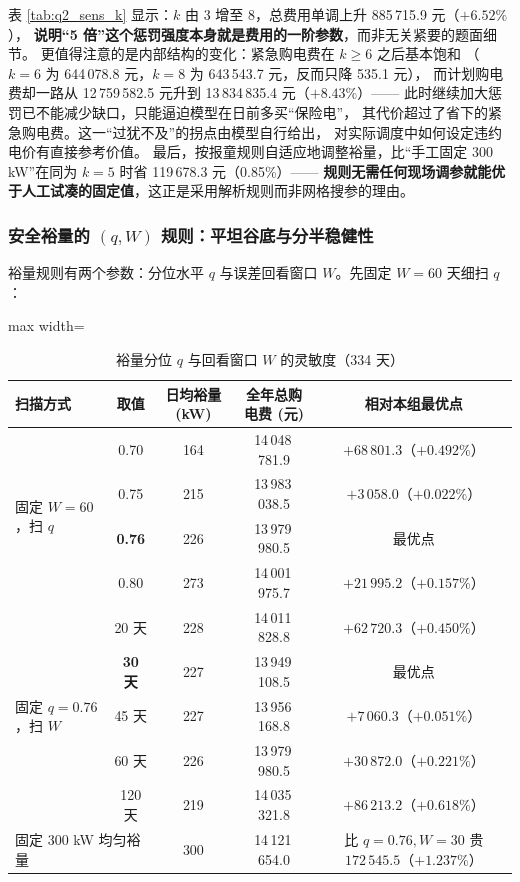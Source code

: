 \documentclass{cumcmthesis}
\begin{document}
\noindent 表 \ref{tab:q2_sens_k} 显示：$k$ 由 3 增至 8，总费用单调上升 885\,715.9 元（$+6.52\%$），
\textbf{说明“5 倍”这个惩罚强度本身就是费用的一阶参数}，而非无关紧要的题面细节。
更值得注意的是内部结构的变化：紧急购电费在 $k\ge6$ 之后基本饱和
（$k=6$ 为 644\,078.8 元，$k=8$ 为 643\,543.7 元，反而只降 535.1 元），
而计划购电费却一路从 12\,759\,582.5 元升到 13\,834\,835.4 元（$+8.43\%$）——
此时继续加大惩罚已不能减少缺口，只能逼迫模型在日前多买“保险电”，
其代价超过了省下的紧急购电费。这一“过犹不及”的拐点由模型自行给出，
对实际调度中如何设定违约电价有直接参考价值。
最后，按报童规则自适应地调整裕量，比“手工固定 300 kW”在同为 $k=5$ 时省 119\,678.3 元（0.85\%）——
\textbf{规则无需任何现场调参就能优于人工试凑的固定值}，这正是采用解析规则而非网格搜参的理由。

\subsubsection{安全裕量的 $(q,W)$ 规则：平坦谷底与分半稳健性}
裕量规则有两个参数：分位水平 $q$ 与误差回看窗口 $W$。先固定 $W=60$ 天细扫 $q$：

\begin{table}[htbp]
\centering
\caption{裕量分位 $q$ 与回看窗口 $W$ 的灵敏度（334 天）}
\label{tab:q2_sens_qw}
\begin{adjustbox}{max width=\textwidth}
\begin{tabular}{lcccc}
\hline
扫描方式 & 取值 & 日均裕量 (kW) & 全年总购电费 (元) & 相对本组最优点 \\
\hline
\multirow{4}{*}{固定 $W=60$，扫 $q$}
  & 0.70 & 164 & 14\,048\,781.9 & $+68\,801.3$（$+0.492\%$）\\
  & 0.75 & 215 & 13\,983\,038.5 & $+3\,058.0$（$+0.022\%$）\\
  & \textbf{0.76} & 226 & 13\,979\,980.5 & 最优点 \\
  & 0.80 & 273 & 14\,001\,975.7 & $+21\,995.2$（$+0.157\%$）\\
\hline
\multirow{5}{*}{固定 $q=0.76$，扫 $W$}
  & 20 天 & 228 & 14\,011\,828.8 & $+62\,720.3$（$+0.450\%$）\\
  & \textbf{30 天} & 227 & 13\,949\,108.5 & 最优点 \\
  & 45 天 & 227 & 13\,956\,168.8 & $+7\,060.3$（$+0.051\%$）\\
  & 60 天 & 226 & 13\,979\,980.5 & $+30\,872.0$（$+0.221\%$）\\
  & 120 天 & 219 & 14\,035\,321.8 & $+86\,213.2$（$+0.618\%$）\\
\hline
\multicolumn{2}{l}{固定 300 kW 均匀裕量} & 300 & 14\,121\,654.0 & 比 $q{=}0.76,W{=}30$ 贵 $172\,545.5$（$+1.237\%$）\\
\hline
\end{tabular}
\end{adjustbox}
\end{table}
\end{document}

